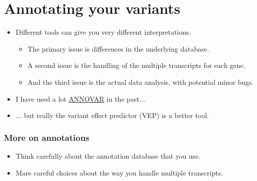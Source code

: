 \documentclass{beamer}
\begin{document}
\section{Annotating your variants}

\begin{frame}
  \begin{itemize}
  \frametitle{This is not easy!}
  \item Different tools can give you very different interpretations.
    \begin{itemize}
    \item The primary issue is differences in the underlying database.
    \item A second issue is the handling of the multiple transcripts for each gene.
    \item And the third issue is the actual data analysis, with potential minor bugs.
    \end{itemize}
  \item I have used a lot \href{http://annovar.openbioinformatics.org/en/latest/}{ANNOVAR} in the past...
  \item ... but really the variant effect predictor (VEP) is a better tool.
  \end{itemize}
\end{frame}


\begin{frame}
  \frametitle{More on annotations}
  \begin{itemize}
  \item Think carefully about the annotation database that you use.
  \item Mare careful choices about the way you handle multiple transcripts.
  \end{itemize}
\end{frame}
\end{document}
